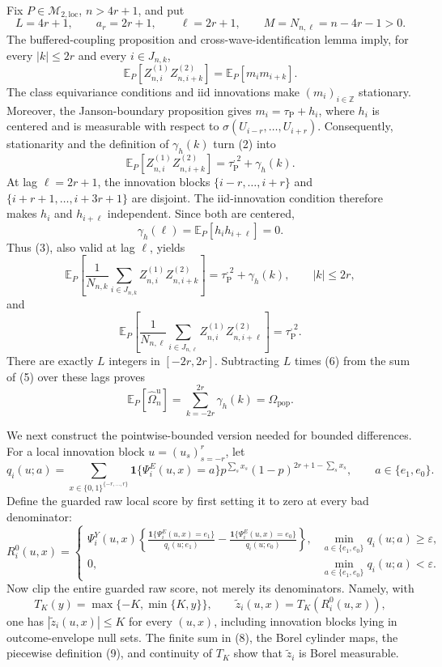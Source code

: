 Fix \(P\in\mathcal M_{2,\mathrm{loc}}\), \(n>4r+1\), and put
\[
 L=4r+1,\qquad a_r=2r+1,\qquad \ell=2r+1,
 \qquad M=N_{n,\ell}=n-4r-1>0. \tag{1}
\]
The buffered-coupling proposition and cross-wave-identification lemma imply, for every \(|k|\le 2r\) and every \(i\in J_{n,k}\),
\[
 \mathbb E_P[Z_{n,i}^{(1)}Z_{n,i+k}^{(2)}]
 =\mathbb E_P[m_i m_{i+k}]. \tag{2}
\]
The class equivariance conditions and iid innovations make \((m_i)_{i\in\mathbb Z}\) stationary.  Moreover, the Janson-boundary proposition gives \(m_i=\tau_{\mathrm P}+h_i\), where \(h_i\) is centered and is measurable with respect to \(\sigma(U_{i-r},\ldots,U_{i+r})\).  Consequently, stationarity and the definition of \(\gamma_h(k)\) turn (2) into
\[
 \mathbb E_P[Z_{n,i}^{(1)}Z_{n,i+k}^{(2)}]
 =\tau_{\mathrm P}^{,2}+\gamma_h(k). \tag{3}
\]
At lag \(\ell=2r+1\), the innovation blocks \(\{i-r,\ldots,i+r\}\) and \(\{i+r+1,\ldots,i+3r+1\}\) are disjoint.  The iid-innovation condition therefore makes \(h_i\) and \(h_{i+\ell}\) independent.  Since both are centered,
\[
 \gamma_h(\ell)=\mathbb E_P[h_i h_{i+\ell}]=0. \tag{4}
\]
Thus (3), also valid at lag \(\ell\), yields
\[
 \mathbb E_P\!\left[
  \frac{1}{N_{n,k}}\sum_{i\in J_{n,k}}
  Z_{n,i}^{(1)}Z_{n,i+k}^{(2)}
 \right]
 =\tau_{\mathrm P}^{,2}+\gamma_h(k),
 \qquad |k|\le 2r, \tag{5}
\]
and
\[
 \mathbb E_P\!\left[
  \frac{1}{N_{n,\ell}}\sum_{i\in J_{n,\ell}}
  Z_{n,i}^{(1)}Z_{n,i+\ell}^{(2)}
 \right]
 =\tau_{\mathrm P}^{,2}. \tag{6}
\]
There are exactly \(L\) integers in \([-2r,2r]\).  Subtracting \(L\) times (6) from the sum of (5) over these lags proves
\[
 \mathbb E_P[\widehat\Omega_n^{\mathrm u}]
 =\sum_{k=-2r}^{2r}\gamma_h(k)
 =\Omega_{\mathrm{pop}}. \tag{7}
\]

We next construct the pointwise-bounded version needed for bounded differences.  For a local innovation block \(u=(u_s)_{s=-r}^r\), let
\[
 q_i(u;a)=\sum_{x\in\{0,1\}^{\{-r,\ldots,r\}}}
 \mathbf 1\{\Psi_i^E(u,x)=a\}
 p^{\sum_s x_s}(1-p)^{2r+1-\sum_s x_s},
 \qquad a\in\{e_1,e_0\}. \tag{8}
\]
Define the guarded raw local score by first setting it to zero at every bad denominator:
\[
 R_i^0(u,x)=
 \begin{cases}
 \displaystyle
 \Psi_i^Y(u,x)\left\{
  \frac{\mathbf 1\{\Psi_i^E(u,x)=e_1\}}{q_i(u;e_1)}
  -\frac{\mathbf 1\{\Psi_i^E(u,x)=e_0\}}{q_i(u;e_0)}
 \right\},
 &\min_{a\in\{e_1,e_0\}}q_i(u;a)\ge\varepsilon,\\[3mm]
 0,&\min_{a\in\{e_1,e_0\}}q_i(u;a)<\varepsilon.
 \end{cases} \tag{9}
\]
Now clip the entire guarded raw score, not merely its denominators.  Namely, with
\[
 T_K(y)=\max\{-K,\min\{K,y\}\},
 \qquad \widetilde z_i(u,x)=T_K(R_i^0(u,x)), \tag{10}
\]
one has \(|\widetilde z_i(u,x)|\le K\) for every \((u,x)\), including innovation blocks lying in outcome-envelope null sets.  The finite sum in (8), the Borel cylinder maps, the piecewise definition (9), and continuity of \(T_K\) show that \(\widetilde z_i\) is Borel measurable.

